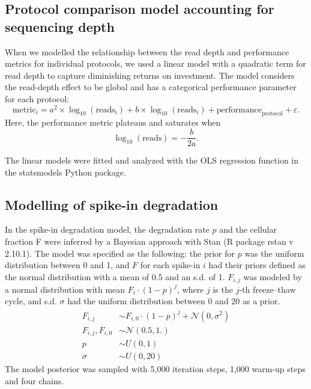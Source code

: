 \subsection{Protocol comparison model accounting for sequencing depth}

\begin{sloppypar}
When we modelled the relationship between the read depth and performance metrics for individual protocols, we used a linear model with a quadratic term for read depth to capture diminishing returns on investment. The model considers the read-depth effect to be global and has a categorical performance parameter for each protocol:
\[
    \text{metric}_i = a^2 \times \log_{10}(\text{reads}_i) + b \times \log_{10}(\text{reads}_i) +  \text{performance}_\text{protocol} + \varepsilon.
\]
Here, the performance metric plateaus and saturates when
\[
    \log_{10} (\text{reads}) = - \frac{b}{2a}.
\]
\end{sloppypar}

The linear models were fitted and analyzed with the OLS regression function in the statsmodels Python package.

\subsection{Modelling of spike-in degradation} 

In the spike-in degradation model, the degradation rate \( p \) and the cellular fraction F were inferred by a Bayesian approach with Stan \cite{Carpenter2016-zx} (R package rstan v 2.10.1). The model was specified as the following: the prior for \( p \) was the uniform distribution between 0 and 1, and \( F \) for each spike-in \( i \) had their priors defined as the normal distribution with a mean of 0.5 and an s.d. of 1. \( F_{i,j} \) was modeled by a normal distribution with mean \( F_i \cdot (1 - p)^j \), where \( j \) is the \( j \)-th freeze–thaw cycle, and s.d. \( \sigma \) had the uniform distribution between 0 and 20 as a prior.
\begin{align*}
    F_{i,j} & \sim F_{i, 0} \cdot (1 - p)^j + \mathcal{N}(0, \sigma^2 ) \\
    F_{i, j}, F_{i, 0} & \sim \mathcal{N}(0.5, 1.) \\
    p & \sim U(0, 1) \\
    \sigma & \sim U(0, 20)
\end{align*}
The model posterior was sampled with 5,000 iteration steps, 1,000 warm-up steps and four chains.